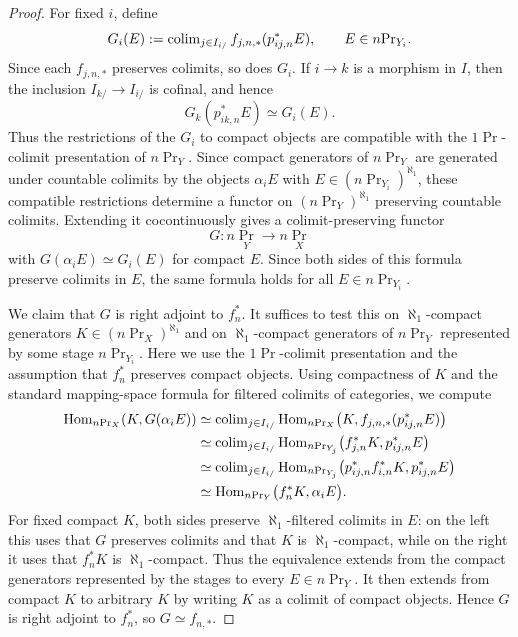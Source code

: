 \documentclass[11pt]{book}
\begin{document}
	\begin{proof}
		For fixed $i$, define
		\[
			G_i(E) :=
			\operatorname{colim}_{j \in I_{i/}} f_{j,n,*}(p_{ij,n}^*E),
			\qquad E \in n\textup{Pr}_{Y_i}.
		\]
		Since each $f_{j,n,*}$ preserves colimits, so does $G_i$. If
		$i \to k$ is a morphism in $I$, then the inclusion
		$I_{k/} \to I_{i/}$ is cofinal, and hence
		\[
			G_k(p_{ik,n}^*E) \simeq G_i(E).
		\]
		Thus the restrictions of the $G_i$ to compact objects are compatible
		with the $1\Pr$-colimit presentation of $n\Pr_Y$. Since compact
		generators of $n\Pr_Y$ are generated under countable colimits by the
		objects $\alpha_iE$ with $E \in (n\Pr_{Y_i})^{\aleph_1}$, these
		compatible restrictions determine a functor on
		$(n\Pr_Y)^{\aleph_1}$ preserving countable colimits. Extending it
		cocontinuously gives a colimit-preserving functor
		\[
			G\colon n\Pr_Y \to n\Pr_X
		\]
		with $G(\alpha_iE) \simeq G_i(E)$ for compact $E$. Since both sides
		of this formula preserve colimits in $E$, the same formula holds for
		all $E \in n\Pr_{Y_i}$.

		We claim that $G$ is right adjoint to $f_n^*$. It suffices to test this
		on $\aleph_1$-compact generators $K \in (n\Pr_X)^{\aleph_1}$ and on
		$\aleph_1$-compact generators of $n\Pr_Y$ represented by some stage
		$n\Pr_{Y_i}$. Here we use the $1\Pr$-colimit presentation and the
		assumption that $f_n^*$ preserves compact objects. Using compactness
		of $K$ and the standard mapping-space formula for filtered colimits of
		categories, we compute
		\[
		\begin{aligned}
			\operatorname{Hom}_{n\textup{Pr}_X}(K,G(\alpha_iE))
			&\simeq
			\operatorname{colim}_{j \in I_{i/}}
			\operatorname{Hom}_{n\textup{Pr}_X}\bigl(K,f_{j,n,*}(p_{ij,n}^*E)\bigr) \\
			&\simeq
			\operatorname{colim}_{j \in I_{i/}}
			\operatorname{Hom}_{n\textup{Pr}_{Y_j}}\bigl(f_{j,n}^*K,p_{ij,n}^*E\bigr) \\
			&\simeq
			\operatorname{colim}_{j \in I_{i/}}
			\operatorname{Hom}_{n\textup{Pr}_{Y_j}}\bigl(p_{ij,n}^*f_{i,n}^*K,p_{ij,n}^*E\bigr) \\
			&\simeq
			\operatorname{Hom}_{n\textup{Pr}_Y}\bigl(f_n^*K,\alpha_iE\bigr).
		\end{aligned}
		\]
		For fixed compact $K$, both sides preserve $\aleph_1$-filtered
		colimits in $E$: on the left this uses that $G$ preserves colimits and
		that $K$ is $\aleph_1$-compact, while on the right it uses that
		$f_n^*K$ is $\aleph_1$-compact. Thus the equivalence extends from the
		compact generators represented by the stages to every
		$E \in n\Pr_Y$. It then extends from compact $K$ to arbitrary $K$ by
		writing $K$ as a colimit of compact objects. Hence $G$ is right adjoint
		to $f_n^*$, so $G \simeq f_{n,*}$.
	\end{proof}
\end{document}
